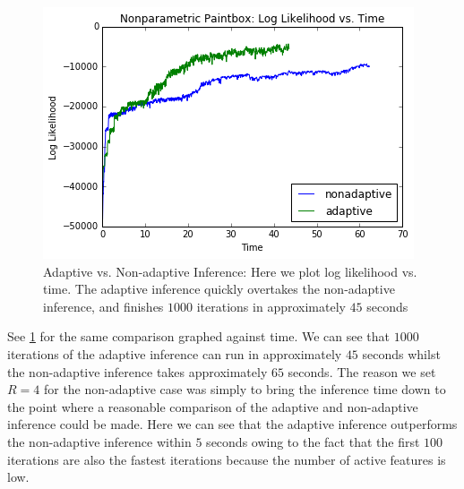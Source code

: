 \documentclass{article}
\begin{document}
\begin{figure}[ht]
\vskip 0.2in
\begin{center}
\centerline{\includegraphics[width=\columnwidth]{ll_t}}
\caption{Adaptive vs. Non-adaptive Inference: Here we plot log likelihood vs. time.  The adaptive inference quickly overtakes the non-adaptive inference, and finishes $1000$ iterations in approximately $45$ seconds}
\label{ll_t}
\end{center}
\vskip -0.2in
\end{figure}
See \ref{ll_t} for the same comparison graphed against time.  We can see that $1000$ iterations of the adaptive inference can run in approximately $45$ seconds whilst the non-adaptive inference takes approximately $65$ seconds.  The reason we set $R=4$ for the non-adaptive case was simply to bring the inference time down to the point where a reasonable comparison of the adaptive and non-adaptive inference could be made.  Here we can see that the adaptive inference outperforms the non-adaptive inference within $5$ seconds owing to the fact that the first $100$ iterations are also the fastest iterations because the number of active features is low.        
\end{document}
